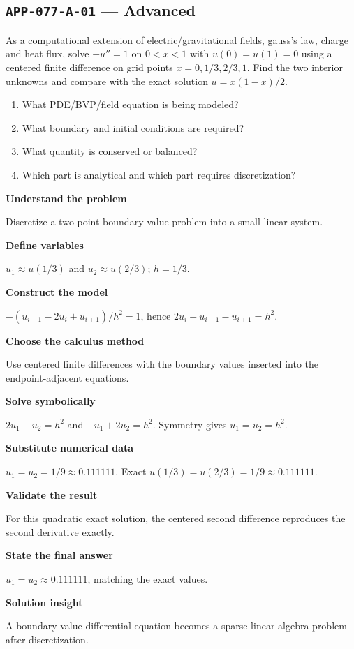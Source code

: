 \documentclass[11pt]{book}
\newcommand{\pid}[1]{\texttt{#1}}
\begin{document}
\subsection*{\pid{APP-077-A-01} — Advanced}
\begin{problembox}
As a computational extension of electric/gravitational fields, gauss's law, charge and heat flux, solve $-u''=1$ on $0<x<1$ with $u(0)=u(1)=0$ using a centered finite difference on grid points $x=0,1/3,2/3,1$. Find the two interior unknowns and compare with the exact solution $u=x(1-x)/2$.
\end{problembox}
\begin{promptbox}\begin{enumerate}
\item What PDE/BVP/field equation is being modeled?
\item What boundary and initial conditions are required?
\item What quantity is conserved or balanced?
\item Which part is analytical and which part requires discretization?
\end{enumerate}\end{promptbox}
\begin{solutionbox}
\textbf{Understand the problem}\par Discretize a two-point boundary-value problem into a small linear system.\par\medskip
\textbf{Define variables}\par $u_1\approx u(1/3)$ and $u_2\approx u(2/3)$; $h=1/3$.\par\medskip
\textbf{Construct the model}\par $-(u_{i-1}-2u_i+u_{i+1})/h^2=1$, hence $2u_i-u_{i-1}-u_{i+1}=h^2$.\par\medskip
\textbf{Choose the calculus method}\par Use centered finite differences with the boundary values inserted into the endpoint-adjacent equations.\par\medskip
\textbf{Solve symbolically}\par $2u_1-u_2=h^2$ and $-u_1+2u_2=h^2$. Symmetry gives $u_1=u_2=h^2$.\par\medskip
\textbf{Substitute numerical data}\par $u_1=u_2=1/9\approx 0.111111$. Exact $u(1/3)=u(2/3)=1/9\approx 0.111111$.\par\medskip
\textbf{Validate the result}\par For this quadratic exact solution, the centered second difference reproduces the second derivative exactly.\par\medskip
\textbf{State the final answer}\par $u_1=u_2\approx 0.111111$, matching the exact values.\par\medskip
\textbf{Solution insight}\par A boundary-value differential equation becomes a sparse linear algebra problem after discretization.\par\medskip
\end{solutionbox}
\end{document}
